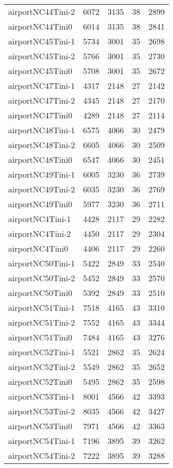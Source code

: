 \begin{longtable}{lrrrr}
airportNC44Tini-2 & 6072 & 3135 & 38 & 2899 \\
airportNC44Tini0 & 6014 & 3135 & 38 & 2841 \\
airportNC45Tini-1 & 5734 & 3001 & 35 & 2698 \\
airportNC45Tini-2 & 5766 & 3001 & 35 & 2730 \\
airportNC45Tini0 & 5708 & 3001 & 35 & 2672 \\
airportNC47Tini-1 & 4317 & 2148 & 27 & 2142 \\
airportNC47Tini-2 & 4345 & 2148 & 27 & 2170 \\
airportNC47Tini0 & 4289 & 2148 & 27 & 2114 \\
airportNC48Tini-1 & 6575 & 4066 & 30 & 2479 \\
airportNC48Tini-2 & 6605 & 4066 & 30 & 2509 \\
airportNC48Tini0 & 6547 & 4066 & 30 & 2451 \\
airportNC49Tini-1 & 6005 & 3230 & 36 & 2739 \\
airportNC49Tini-2 & 6035 & 3230 & 36 & 2769 \\
airportNC49Tini0 & 5977 & 3230 & 36 & 2711 \\
airportNC4Tini-1 & 4428 & 2117 & 29 & 2282 \\
airportNC4Tini-2 & 4450 & 2117 & 29 & 2304 \\
airportNC4Tini0 & 4406 & 2117 & 29 & 2260 \\
airportNC50Tini-1 & 5422 & 2849 & 33 & 2540 \\
airportNC50Tini-2 & 5452 & 2849 & 33 & 2570 \\
airportNC50Tini0 & 5392 & 2849 & 33 & 2510 \\
airportNC51Tini-1 & 7518 & 4165 & 43 & 3310 \\
airportNC51Tini-2 & 7552 & 4165 & 43 & 3344 \\
airportNC51Tini0 & 7484 & 4165 & 43 & 3276 \\
airportNC52Tini-1 & 5521 & 2862 & 35 & 2624 \\
airportNC52Tini-2 & 5549 & 2862 & 35 & 2652 \\
airportNC52Tini0 & 5495 & 2862 & 35 & 2598 \\
airportNC53Tini-1 & 8001 & 4566 & 42 & 3393 \\
airportNC53Tini-2 & 8035 & 4566 & 42 & 3427 \\
airportNC53Tini0 & 7971 & 4566 & 42 & 3363 \\
airportNC54Tini-1 & 7196 & 3895 & 39 & 3262 \\
airportNC54Tini-2 & 7222 & 3895 & 39 & 3288 \\

\end{longtable}

